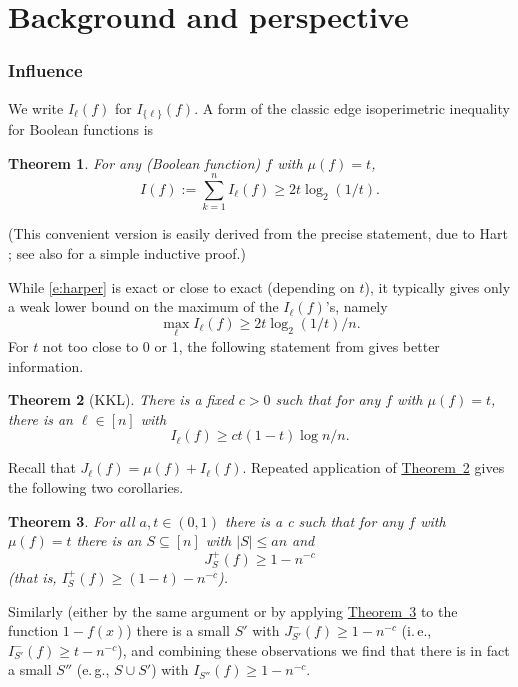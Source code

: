 \documentclass[11pt]{article}
\numberwithin{equation}{section}
\theoremstyle{definition}
\theoremstyle{plain}
\newcommand{\ie}{i.\,e.}
\newcommand{\eg}{e.\,g.}
\newcommand{\expref}[2]{\hyperref[#2]{#1~\ref{#2}}}
\newtheorem{thm}{Theorem}[section]
\newcommand{\mn}[0]{\medskip\noindent}
\newcommand{\nin}[0]{\noindent}
\newcommand{\sub}[0]{\subseteq}
\newcommand{\0}[0]{\emptyset}
\begin{document}
\section {Background and perspective}
\label{s:bac}

\subsubsection *{Influence}

We write $I_\ell (f)$ for $I_{\{\ell\}}(f)$.  A form of
the classic edge isoperimetric inequality for Boolean
functions is  
%

\begin{thm}\label{Tiso}
For any (Boolean function) $f$ %
%
 with $\mu(f) =t$,
\begin {equation}
\label {e:harper}
I(f) := \sum_{k=1}^n  I_\ell (f) \ge  2t \log_2 (1/t).
\end {equation}
\end {thm}

\mn
(This convenient version is easily derived from the precise
statement, due to Hart \cite{Hart}; see also \cite[Sec. 7]{KK07}
for a simple inductive proof.)

\mn
While \eqref{e:harper} is exact or close to exact
(depending on $t$), it typically gives
only a weak lower bound on the maximum of the %
$I_\ell (f)$'s,   %
namely
\begin {equation}
\label {e:harper-max}
\max_\ell I_\ell (f) \ge  2t \log_2 (1/t)/n.
\end {equation}
For $t$ not too close to 0 or 1, the
following
statement from \cite{kkl} gives
better information.


\begin{thm} [KKL]
\label {t:kkl}
There is a fixed $c>0$ such that
for any
$f$ with $\mu(f) =t$,
there is an $\ell \in [n]$ with
\begin {equation}
\label {e:kkl}
I_\ell (f) \ge c t (1-t)\log n/n.
\end {equation}
\end {thm}
\nin
Recall that $J_\ell (f)=\mu(f) +I_\ell (f)$. Repeated application of \expref{Theorem}{t:kkl} gives
the following two corollaries.

\begin {thm}
\label {t:ra1}
For all $a, t\in (0,1)$ there is a c such that
for any
$f$ with $\mu(f) =t$ there
is an $S\sub [n]$ with $|S|\leq an$ and
$$J^+_S(f) \ge 1 - n^{-c}$$ (that is,
$I^+_S(f) \ge (1-t) - n^{-c}$).

\end {thm}
\nin
Similarly (either by the same argument or by applying
\expref{Theorem}{t:ra1} to the function $1-f(x)$)
there is a small $S'$
with
$J^-_{S'}(f) \ge 1 - n^{-c}$ (\ie, $I^-_{S'}(f) \ge t - n^{-c}$),
and combining these observations we find that there is
in fact a small $S''$ (\eg, $S \cup S'$) with
$I_{S''}(f) \ge 1-n^{-c}$.
\end{document}
